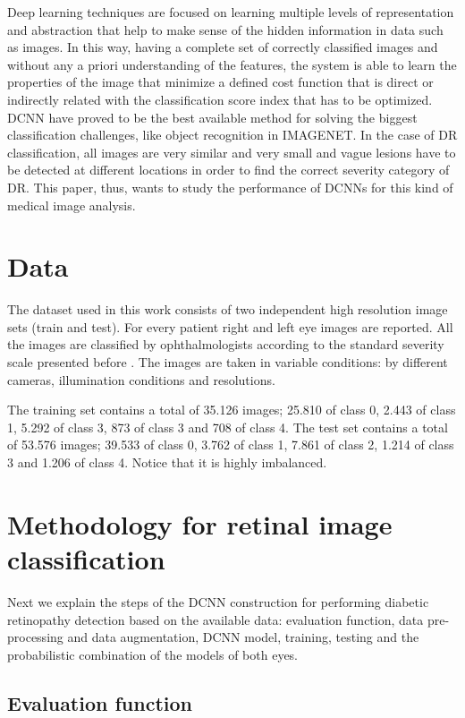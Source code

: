 \documentclass{IOS-Book-Article}
\begin{document}
Deep learning techniques are focused on learning multiple levels of representation and abstraction that help to make sense of the hidden information in data such as images. In this way, having a complete set of correctly classified images and without any a priori understanding of the features, the system is able to learn the properties of the image that minimize a defined cost function that is direct or indirectly related with the classification score index that has to be optimized. DCNN have proved to be the best available method for solving the biggest classification challenges, like object recognition in IMAGENET\cite{ILSVRC15}. 
In the case of DR classification, all images are very similar and very small and vague lesions have to be detected at different locations in order to find the correct severity category of DR. This paper, thus, wants to study the performance of DCNNs for this kind of medical image analysis.

\section{Data}

The dataset used in this work consists of two independent high resolution image sets (train and test). For every patient right and left eye images are reported. All the images are classified by ophthalmologists according to the standard severity scale presented before \cite{diaclass}. The images are taken in variable conditions: by different cameras, illumination conditions and resolutions. 

The training set contains a total of 35.126 images; 25.810 of class 0, 2.443 of class 1, 5.292 of class 3, 873 of class 3 and 708 of class 4. The test set contains a total of 53.576 images; 39.533 of class 0, 3.762 of class 1, 7.861 of class 2, 1.214 of class 3 and 1.206 of class 4. Notice that it is highly imbalanced.


\section{Methodology for retinal image classification}

Next we explain the steps of the DCNN construction for performing diabetic retinopathy detection based on the available data: evaluation function, data pre-processing and data augmentation, DCNN model, training, testing and the probabilistic combination of the models of both eyes.

\subsection{Evaluation function}
\end{document}
